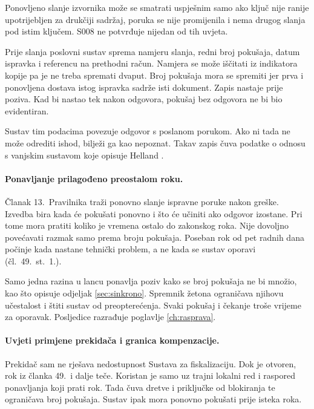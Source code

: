 Ponovljeno slanje izvornika može se smatrati uspješnim samo ako ključ nije
ranije upotrijebljen za drukčiji sadržaj, poruka se nije promijenila i nema
drugog slanja pod istim ključem. S008 ne potvrđuje nijedan od tih uvjeta.

Prije slanja poslovni sustav sprema namjeru slanja, redni broj pokušaja,
datum ispravka i referencu na prethodni račun. Namjera se može iščitati iz
indikatora kopije pa je ne treba spremati dvaput. Broj pokušaja mora se
spremiti jer prva i ponovljena dostava istog ispravka sadrže isti dokument.
Zapis nastaje prije poziva. Kad bi nastao tek nakon odgovora, pokušaj bez
odgovora ne bi bio evidentiran.

Sustav tim podacima povezuje odgovor s poslanom porukom. Ako ni tada ne može
odrediti ishod, bilježi ga kao nepoznat. Takav zapis čuva podatke o odnosu s
vanjskim sustavom koje opisuje Helland \cite{helland2007lifebeyond}.

\paragraph{Ponavljanje prilagođeno preostalom roku.}
Članak 13.\ Pravilnika traži ponovno slanje ispravne poruke nakon greške.
Izvedba bira kada će pokušati ponovno i što će učiniti ako odgovor izostane.
Pri tome mora pratiti koliko je vremena ostalo do zakonskog roka. Nije
dovoljno povećavati razmak samo prema broju pokušaja. Poseban rok od pet
radnih dana počinje kada nastane tehnički problem, a ne kada se sustav
oporavi (čl.~49.~st.~1.).

Samo jedna razina u lancu ponavlja poziv kako se broj pokušaja ne bi
množio, kao što opisuje odjeljak \ref{sec:sinkrono}. Spremnik žetona
ograničava njihovu učestalost i štiti sustav od preopterećenja. Svaki
pokušaj i čekanje troše vrijeme za oporavak. Posljedice razrađuje poglavlje
\ref{ch:rasprava}.

\paragraph{Uvjeti primjene prekidača i granica kompenzacije.}
Prekidač sam ne rješava nedostupnost Sustava za fiskalizaciju. Dok je
otvoren, rok iz članka 49.\ i dalje teče. Koristan je samo uz trajni lokalni
red i raspored ponavljanja koji prati rok. Tada čuva dretve i priključke od
blokiranja te ograničava broj pokušaja. Sustav ipak mora ponovno pokušati
prije isteka roka.


